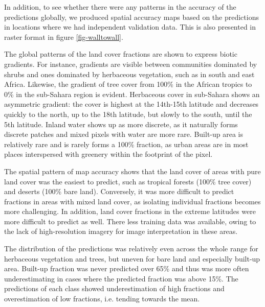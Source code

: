 \documentclass[review,authoryear,3p]{elsarticle}
\begin{document}

In addition, to see whether there were any patterns in the accuracy of the predictions globally, we produced spatial accuracy maps based on the predictions in locations where we had independent validation data.
This is also presented in raster format in figure \ref{fig-walltowall}.

The global patterns of the land cover fractions are shown to express biotic gradients.
For instance, gradients are visible between communities dominated by shrubs and ones dominated by herbaceous vegetation, such as in south and east Africa.
Likewise, the gradient of tree cover from 100\% in the African tropics to 0\% in the sub-Sahara region is evident.
Herbaceous cover in sub-Sahara shows an asymmetric gradient: the cover is highest at the 14th-15th latitude and decreases quickly to the north, up to the 18th latitude, but slowly to the south, until the 5th latitude.
Inland water shows up as more discrete, as it naturally forms discrete patches and mixed pixels with water are more rare.
Built-up area is relatively rare and is rarely forms a 100\% fraction, as urban areas are in most places interspersed with greenery within the footprint of the pixel.

The spatial pattern of map accuracy shows that the land cover of areas with pure land cover was the easiest to predict, such as tropical forests (100\% tree cover) and deserts (100\% bare land).
Conversely, it was more difficult to predict fractions in areas with mixed land cover, as isolating individual fractions becomes more challenging.
In addition, land cover fractions in the extreme latitudes were more difficult to predict as well.
There less training data was available, owing to the lack of high-resolution imagery for image interpretation in these areas.

The distribution of the predictions was relatively even across the whole range for herbaceous vegetation and trees, but uneven for bare land and especially built-up area.
Built-up fraction was never predicted over 65\% and thus was more often underestimating in cases where the predicted fraction was above 15\%.
The predictions of each class showed underestimation of high fractions and overestimation of low fractions, i.e. tending towards the mean.
\end{document}

